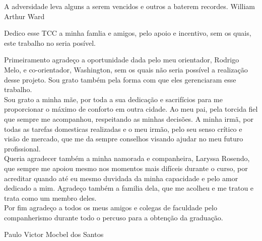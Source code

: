 \documentclass{./public/ufpatccdoisautores}
\begin{document}

\begin{ufpaEpigrafe}
A adversidade leva alguns a serem vencidos e
 outros a baterem recordes. William Arthur Ward
\end{ufpaEpigrafe}

\ufpaPaginaDeAprovacao

\begin{ufpaOferecimento}
    Dedico esse TCC a minha famlia e amigos, pelo apoio e incentivo,
    sem os quais, este trabalho no seria posível.
\end{ufpaOferecimento}

\begin{ufpaAgradecimentos}
		Primeiramento agradeço a oportunidade dada pelo meu orientador, Rodrigo Melo, e co-orientador, Washington, sem os quais não seria possível a realização desse projeto. Sou grato também pela forma com que eles gerenciaram esse trabalho.\\
		
		Sou grato a minha mãe, por toda a sua dedicação e sacrifícios para me proporcionar o máximo de conforto em outra cidade. Ao meu pai, pela torcida fiel que sempre me acompanhou, respeitando as minhas decisões. A minha irmã, por todas as tarefas domesticas realizadas e o meu irmão, pelo seu senso crítico e visão de mercado, que me da sempre conselhos visando ajudar no meu futuro profissional.\\

		Queria agradecer também a minha namorada e companheira, Laryssa Rosendo, que sempre me apoiou mesmo nos momentos mais difíceis durante o curso, por acreditar quando até eu mesmo duvidada da minha capacidade e pelo amor dedicado a mim. Agradeço também a familia dela, que me acolheu e me tratou e trata como um membro deles.\\

		Por fim agradeço a todos os meus amigos e colegas de faculdade pelo companherismo durante todo o percuso para a obtenção da graduação.
	\begin{flushright}
		Paulo Victor Mocbel dos Santos
	\end{flushright}

\end{ufpaAgradecimentos}
\end{document}
